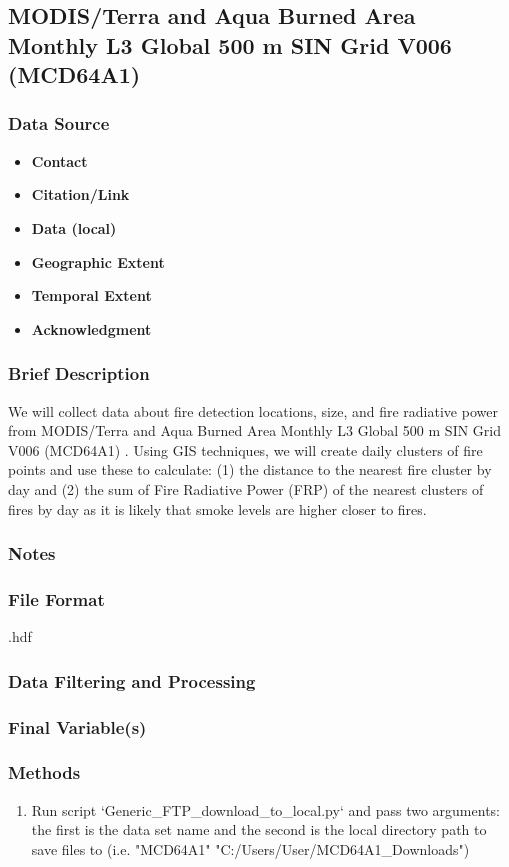 \subsection{MODIS/Terra and Aqua Burned Area Monthly L3 Global 500 m SIN Grid V006 (MCD64A1) }
\subsubsection*{Data Source}
\begin{itemize}[nolistsep]
\item \textbf{Contact}
\item \textbf{Citation/Link}
\item \textbf{Data (local)}
\item \textbf{Geographic Extent}
\item \textbf{Temporal Extent}
\item \textbf{Acknowledgment}
\end{itemize}
\subsubsection*{Brief Description}

We will collect data about fire detection locations, size, and fire radiative power from MODIS/Terra and Aqua Burned Area Monthly L3 Global 500 m SIN Grid V006 (MCD64A1) 
\citep{Schroeder2014}. %
Using GIS techniques, we will create daily clusters of fire points and use these to calculate: (1) the distance to the nearest fire cluster by day and (2) the sum of Fire Radiative Power (FRP) of the nearest clusters of fires by day as it is likely that smoke levels are higher closer to fires.

\subsubsection*{Notes}
\subsubsection*{File Format} .hdf
\subsubsection*{Data Filtering and Processing}
\subsubsection*{Final Variable(s)}
\subsubsection*{Methods}
\begin{enumerate}
\item Run script `Generic\_FTP\_download\_to\_local.py` and pass two arguments: the first is the data set name and the second is the local directory path to save files to (i.e. "MCD64A1" "C:/Users/User/MCD64A1\_Downloads")
\end{enumerate}
